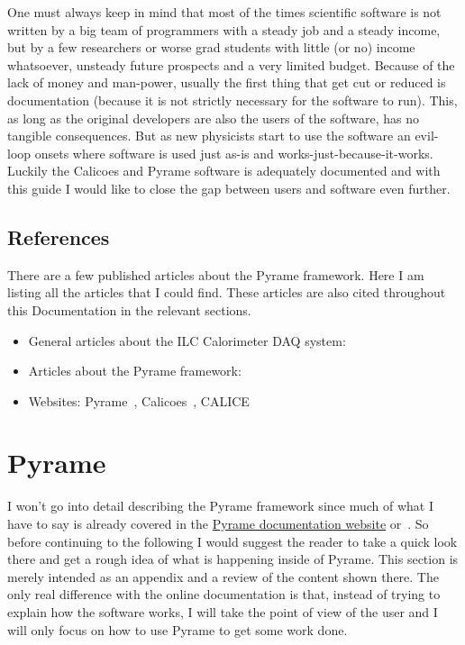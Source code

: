One must always keep in mind that most of the times scientific software is not
written by a big team of programmers with a steady job and a steady income, but
by a few researchers or worse grad students with little (or no) income
whatsoever, unsteady future prospects and a very limited budget. Because of the
lack of money and man-power, usually the first thing that get cut or reduced is
documentation (because it is not strictly necessary for the software to
run). This, as long as the original developers are also the users of the
software, has no tangible consequences. But as new physicists start to use the
software an evil-loop onsets where software is used just as-is and
works-just-because-it-works. Luckily the Calicoes and Pyrame software is
adequately documented and with this guide I would like to close the gap between
users and software even further.

\subsection{References}
There are a few published articles about the Pyrame framework. Here I am listing
all the articles that I could find. These articles are also cited throughout this
Documentation in the relevant sections.
\begin{itemize}
\item General articles about the ILC Calorimeter DAQ
  system:\cite{Gastaldi:2014vaa,Gastaldi:2014oid}
\item Articles about the Pyrame
  framework:\cite{Gastaldi:2014oid,Rubio-Roy:2015,Rubio-Roy:2017nco}
\item Websites: Pyrame~\cite{Pyrame}, Calicoes~\cite{Calicoes},
  CALICE\cite{CALICE-DAQ}
\end{itemize}

\section{Pyrame}
I won't go into detail describing the Pyrame framework since much of what I have
to say is already covered in the
\href{http://llr.in2p3.fr/sites/pyrame/documentation/}{Pyrame documentation
  website} or~\cite{Rubio-Roy:2015}. So before continuing to the following I
would suggest the reader to take a quick look there and get a rough idea of what
is happening inside of Pyrame. This section is merely intended as an appendix
and a review of the content shown there. The only real difference with the
online documentation is that, instead of trying to explain how the software
works, I will take the point of view of the user and I will only focus on how to
use Pyrame to get some work done.

